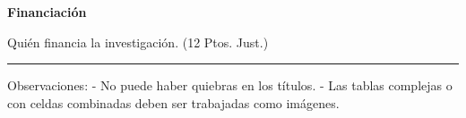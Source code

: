 \documentclass{rcci} %
\begin{document}
\begin{center}
	\textbf{Financiaci\'on} 
\end{center}
Qui\'en financia la investigaci\'on. (12 Ptos. Just.)

\fontsize{10}{10}\selectfont{\theendnotes}

\par\noindent\rule{\textwidth}{0.5pt}

Observaciones:
-	No puede haber quiebras en los t\'itulos.
-	Las tablas complejas o con celdas combinadas deben ser trabajadas como im\'agenes.
\end{document}
